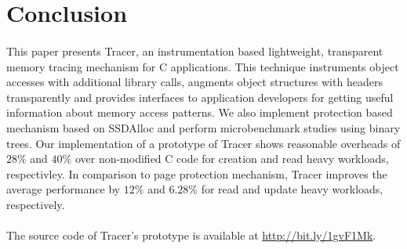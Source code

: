 \section{Conclusion}
\label{sec:conclusion}

\paragraph{}
This paper presents Tracer, an instrumentation based lightweight, transparent memory tracing mechanism for C applications. This technique instruments object accesses with additional library calls, augments object structures with headers transparently and provides interfaces to application developers for getting useful information about memory access patterns. We also implement protection based mechanism based on SSDAlloc \cite{SSDAlloc} and perform microbenchmark studies using binary trees. Our implementation of a prototype of Tracer shows reasonable overheads of $28\%$ and $40\%$ over non-modified C code for creation and read heavy workloads, respectivley. In comparison to page protection mechanism, Tracer improves the average performance by $12\%$ and $6.28\%$ for read and update heavy workloads, respectively.
\paragraph{}
The source code of Tracer's prototype is available at \url{http://bit.ly/1gvF1Mk}.
